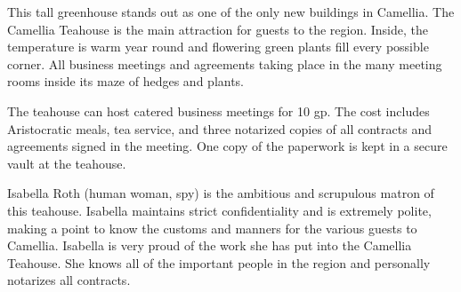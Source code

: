 This tall greenhouse stands out as one of the only new buildings in Camellia.
The Camellia Teahouse is the main attraction for guests to the region.
Inside, the temperature is warm year round and flowering green plants fill every possible corner.
All business meetings and agreements taking place in the many meeting rooms inside its maze of hedges and plants.

The teahouse can host catered business meetings for 10 gp.
The cost includes Aristocratic meals, tea service, and three notarized copies of all contracts and agreements signed in the meeting.
One copy of the paperwork is kept in a secure vault at the teahouse.

Isabella Roth (human woman, spy) is the ambitious and scrupulous matron of this teahouse.
Isabella maintains strict confidentiality and is extremely polite, making a point to know the customs and manners for the various guests to Camellia.
Isabella is very proud of the work she has put into the Camellia Teahouse.
She knows all of the important people in the region and personally notarizes all contracts.
